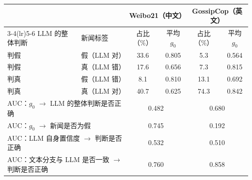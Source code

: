 \begin{tabular}{llcccc}
\toprule
 & & \multicolumn{2}{c}{Weibo21（中文）} & \multicolumn{2}{c}{GossipCop（英文）} \\
\cmidrule(lr){3-4}\cmidrule(lr){5-6}
LLM 的整体判断 & 新闻标签 & 占比（\%） & 平均 $g_0$ & 占比（\%） & 平均 $g_0$ \\
\midrule
判假 & 假（LLM 对） & 33.6 & 0.805 & 5.3 & 0.564 \\
判假 & 真（LLM 错） & 17.6 & 0.656 & 7.3 & 0.815 \\
判真 & 假（LLM 错） & 8.1 & 0.810 & 13.1 & 0.692 \\
判真 & 真（LLM 对） & 40.7 & 0.625 & 74.3 & 0.842 \\
\midrule
\multicolumn{2}{l}{AUC：$g_0$ $\rightarrow$ LLM 的整体判断是否正确} & \multicolumn{2}{c}{0.482} & \multicolumn{2}{c}{0.680} \\
\multicolumn{2}{l}{AUC：$g_0$ $\rightarrow$ 新闻是否为假} & \multicolumn{2}{c}{0.745} & \multicolumn{2}{c}{0.192} \\
\multicolumn{2}{l}{AUC：LLM 自身置信度 $\rightarrow$ 判断是否正确} & \multicolumn{2}{c}{0.532} & \multicolumn{2}{c}{0.510} \\
\multicolumn{2}{l}{AUC：文本分支与 LLM 是否一致 $\rightarrow$ 判断是否正确} & \multicolumn{2}{c}{0.760} & \multicolumn{2}{c}{0.858} \\
\bottomrule
\end{tabular}
